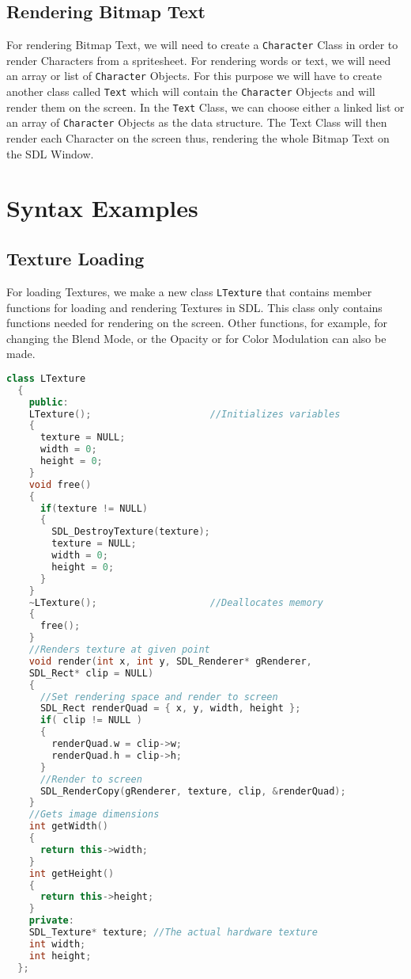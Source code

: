 \documentclass[11pt,fleqn]{book} %
\begin{document}
\subsection{Rendering Bitmap Text}

For rendering Bitmap Text, we will need to create a \texttt{Character} Class in order to render Characters from a spritesheet. For rendering words or text, we will need an array or list of \texttt{Character} Objects. For this purpose we will have to create another class called \texttt{Text} which will contain the \texttt{Character} Objects and will render them on the screen. In the \texttt{Text} Class, we can choose either a linked list or an array of \texttt{Character} Objects as the data structure. The Text Class will then render each Character on the screen thus, rendering the whole Bitmap Text on the SDL Window.

\section{Syntax Examples}

\subsection{Texture Loading}

For loading Textures, we make a new class \texttt{LTexture} that contains member functions for loading and rendering Textures in SDL. This class only contains functions needed for rendering on the screen. Other functions, for example, for changing the Blend Mode, or the Opacity or for Color Modulation can also be made.


\begin{lstlisting}[language=C++, caption={Default, Overloaded and Copy Constructors}]
  class LTexture
  {
    public:
    LTexture();                     //Initializes variables
    {
      texture = NULL;
      width = 0;
      height = 0;
    }
    void free()
    {
      if(texture != NULL)
      {
        SDL_DestroyTexture(texture);
        texture = NULL;
        width = 0;
        height = 0;
      }
    }
    ~LTexture();                    //Deallocates memory
    {
      free();
    }
    //Renders texture at given point
    void render(int x, int y, SDL_Renderer* gRenderer,
    SDL_Rect* clip = NULL)
    {
      //Set rendering space and render to screen
      SDL_Rect renderQuad = { x, y, width, height };
      if( clip != NULL )
      {
        renderQuad.w = clip->w;
        renderQuad.h = clip->h;
      }
      //Render to screen
      SDL_RenderCopy(gRenderer, texture, clip, &renderQuad);
    }
    //Gets image dimensions
    int getWidth()
    {
      return this->width;
    }
    int getHeight()
    {
      return this->height;
    }
    private:
    SDL_Texture* texture; //The actual hardware texture
    int width;
    int height;
  };
\end{lstlisting}
\end{document}
